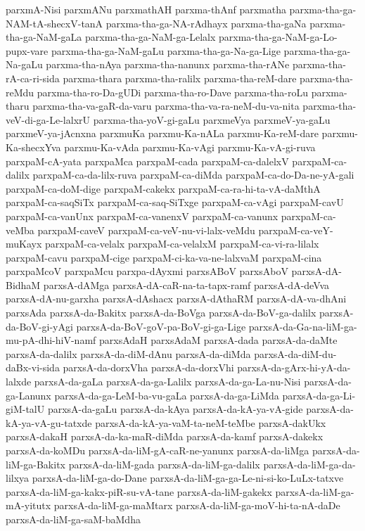 {parxmA-Nisi
parxmANu
parxmathAH
parxma-thAnf
parxmatha
parxma-tha-ga-NAM-tA-shecxV-tanA
parxma-tha-ga-NA-rAdhayx
parxma-tha-gaNa
parxma-tha-ga-NaM-gaLa
parxma-tha-ga-NaM-ga-Lelalx
parxma-tha-ga-NaM-ga-Lo-pupx-vare
parxma-tha-ga-NaM-gaLu
parxma-tha-ga-Na-ga-Lige
parxma-tha-ga-Na-gaLu
parxma-tha-nAya
parxma-tha-nanunx
parxma-tha-rANe
parxma-tha-rA-ca-ri-sida
parxma-thara
parxma-tha-ralilx
parxma-tha-reM-dare
parxma-tha-reMdu
parxma-tha-ro-Da-gUDi
parxma-tha-ro-Dave
parxma-tha-roLu
parxma-tharu
parxma-tha-va-gaR-da-varu
parxma-tha-va-ra-neM-du-va-nita
parxma-tha-veV-di-ga-Le-lalxrU
parxma-tha-yoV-gi-gaLu
parxmeVya
parxmeV-ya-gaLu
parxmeV-ya-jAcnxna
parxmuKa
parxmu-Ka-nALa
parxmu-Ka-reM-dare
parxmu-Ka-shecxYva
parxmu-Ka-vAda
parxmu-Ka-vAgi
parxmu-Ka-vA-gi-ruva
parxpaM-cA-yata
parxpaMca
parxpaM-cada
parxpaM-ca-dalelxV
parxpaM-ca-dalilx
parxpaM-ca-da-lilx-ruva
parxpaM-ca-diMda
parxpaM-ca-do-Da-ne-yA-gali
parxpaM-ca-doM-dige
parxpaM-cakekx
parxpaM-ca-ra-hi-ta-vA-daMthA
parxpaM-ca-saqSiTx
parxpaM-ca-saq-SiTxge
parxpaM-ca-vAgi
parxpaM-cavU
parxpaM-ca-vanUnx
parxpaM-ca-vanenxV
parxpaM-ca-vanunx
parxpaM-ca-veMba
parxpaM-caveV
parxpaM-ca-veV-nu-vi-lalx-veMdu
parxpaM-ca-veY-muKayx
parxpaM-ca-velalx
parxpaM-ca-velalxM
parxpaM-ca-vi-ra-lilalx
parxpaM-cavu
parxpaM-cige
parxpaM-ci-ka-va-ne-lalxvaM
parxpaM-cina
parxpaMcoV
parxpaMcu
parxpa-dAyxmi
parxsABoV
parxsAboV
parxsA-dA-BidhaM
parxsA-dAMga
parxsA-dA-caR-na-ta-tapx-ramf
parxsA-dA-deVva
parxsA-dA-nu-garxha
parxsA-dAshacx
parxsA-dAthaRM
parxsA-dA-va-dhAni
parxsAda
parxsA-da-Bakitx
parxsA-da-BoVga
parxsA-da-BoV-ga-dalilx
parxsA-da-BoV-gi-yAgi
parxsA-da-BoV-goV-pa-BoV-gi-ga-Lige
parxsA-da-Ga-na-liM-ga-mu-pA-dhi-hiV-namf
parxsAdaH
parxsAdaM
parxsA-dada
parxsA-da-daMte
parxsA-da-dalilx
parxsA-da-diM-dAnu
parxsA-da-diMda
parxsA-da-diM-du-daBx-vi-sida
parxsA-da-dorxVha
parxsA-da-dorxVhi
parxsA-da-gArx-hi-yA-da-lalxde
parxsA-da-gaLa
parxsA-da-ga-Lalilx
parxsA-da-ga-La-nu-Nisi
parxsA-da-ga-Lanunx
parxsA-da-ga-LeM-ba-vu-gaLa
parxsA-da-ga-LiMda
parxsA-da-ga-Li-giM-talU
parxsA-da-gaLu
parxsA-da-kAya
parxsA-da-kA-ya-vA-gide
parxsA-da-kA-ya-vA-gu-tatxde
parxsA-da-kA-ya-vaM-ta-neM-teMbe
parxsA-dakUkx
parxsA-dakaH
parxsA-da-ka-maR-diMda
parxsA-da-kamf
parxsA-dakekx
parxsA-da-koMDu
parxsA-da-liM-gA-caR-ne-yanunx
parxsA-da-liMga
parxsA-da-liM-ga-Bakitx
parxsA-da-liM-gada
parxsA-da-liM-ga-dalilx
parxsA-da-liM-ga-da-lilxya
parxsA-da-liM-ga-do-Dane
parxsA-da-liM-ga-ga-Le-ni-si-ko-LuLx-tatxve
parxsA-da-liM-ga-kakx-piR-su-vA-tane
parxsA-da-liM-gakekx
parxsA-da-liM-ga-mA-yitutx
parxsA-da-liM-ga-maMtarx
parxsA-da-liM-ga-moV-hi-ta-nA-daDe
parxsA-da-liM-ga-saM-baMdha
}

